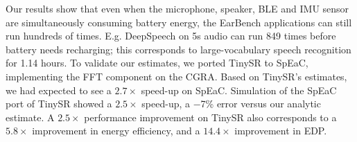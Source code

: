 Our results show that even when the microphone, speaker, BLE and IMU sensor are
simultaneously consuming battery energy, the EarBench applications can still
run hundreds of times. E.g. DeepSpeech on 5s audio can run 849 times before
battery needs recharging; this corresponds to large-vocabulary speech
recognition for 1.14 hours. To validate our estimates, we ported TinySR to
SpEaC, implementing the FFT component on the CGRA. Based on TinySR’s estimates,
we had expected to see a \(2.7\times\) speed-up on SpEaC. Simulation of the SpEaC port
of TinySR showed a \(2.5\times\) speed-up, a −7\% error versus our analytic estimate. A
\(2.5\times\) performance improvement on TinySR also corresponds to a
\(5.8\times\) improvement in energy efficiency, and a \(14.4\times\)
improvement in EDP.


